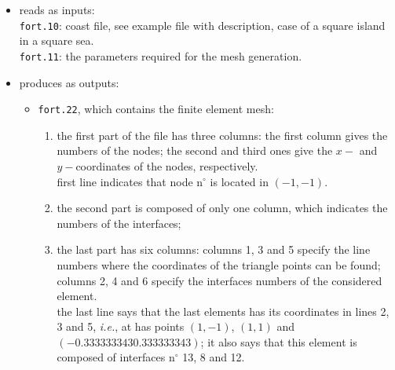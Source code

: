 
\begin{itemize}

  \item   reads as inputs:			\\
  	\texttt{fort.10}:			coast file, see example file with description, case of a square island in a square sea.	\\				
	 	\texttt{fort.11}:			the parameters required for the mesh generation.					
	\item 	produces as outputs:	\\							

\begin{itemize}

\item \texttt{fort.22}, which contains the finite element mesh: 
\begin{enumerate}

\item the first part of the file has three columns: the first column gives the numbers of the nodes; the second and third ones give the $x-$ and $y-$coordinates of the nodes, respectively. \\
\example first line indicates that node n$^{\circ}$ is located in $(-1,-1)$.
\item the second part is composed of only one column, which indicates the numbers of the interfaces;
\item the last part has six columns: columns 1, 3 and 5 specify the line numbers where the coordinates of the triangle points can be found; columns 2, 4 and 6 specify the interfaces numbers of the considered element.\\
\example the last line says that the last elements has its coordinates in lines 2, 3 and 5, \textit{i.e.}, at has points $(1,-1)$, $(1,1)$ and $(-0.333333343  0.333333343)$; it also says that this element is composed of interfaces n$^{\circ}$ 13, 8 and 12.

\end{enumerate}




\end{itemize}
\end{itemize}
